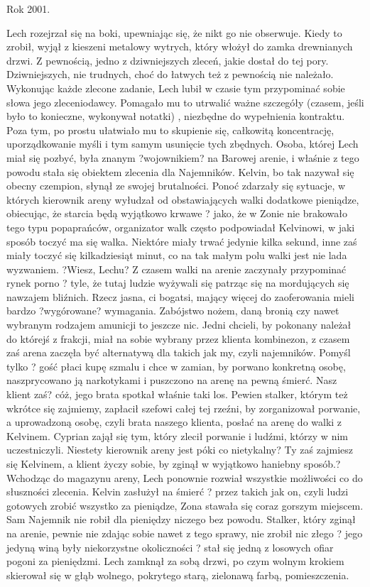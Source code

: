 \documentclass[../MAIN.tex]{subfiles}
\begin{document}
Rok 2001.


Lech rozejrzał się na boki, upewniając się, że nikt go nie obserwuje. Kiedy to zrobił, wyjął z kieszeni metalowy wytrych, który włożył do zamka drewnianych drzwi. Z pewnością, jedno z dziwniejszych zleceń, jakie dostał do tej pory. Dziwniejszych, nie trudnych, choć do łatwych też z pewnością nie należało.
Wykonując każde zlecone zadanie, Lech lubił w czasie tym przypominać sobie słowa jego zleceniodawcy. Pomagało mu to utrwalić ważne szczegóły (czasem, jeśli było to konieczne, wykonywał notatki) , niezbędne do wypełnienia kontraktu. Poza tym, po prostu ułatwiało mu to skupienie się, całkowitą koncentrację, uporządkowanie myśli i tym samym usunięcie tych zbędnych.
Osoba, której Lech miał się pozbyć, była znanym ?wojownikiem? na Barowej arenie, i właśnie z tego powodu stała się obiektem zlecenia dla Najemników. Kelvin, bo tak nazywał się obecny czempion, słynął ze swojej brutalności. Ponoć zdarzały się sytuacje, w których kierownik areny wyłudzał od obstawiających walki dodatkowe pieniądze, obiecując, że starcia będą wyjątkowo krwawe ? jako, że w Zonie nie brakowało tego typu popaprańców, organizator walk często podpowiadał Kelvinowi, w jaki sposób toczyć ma się walka. Niektóre miały trwać jedynie kilka sekund, inne zaś miały toczyć się kilkadziesiąt minut, co na tak małym polu walki jest nie lada wyzwaniem.
?Wiesz, Lechu? Z czasem walki na arenie zaczynały przypominać rynek porno ? tyle, że tutaj ludzie wyżywali się patrząc się na mordujących się nawzajem bliźnich. Rzecz jasna, ci bogatsi, mający więcej do zaoferowania mieli bardzo ?wygórowane? wymagania. Zabójstwo nożem, daną bronią czy nawet wybranym rodzajem amunicji to jeszcze nic. Jedni chcieli, by pokonany należał do którejś z frakcji, miał na sobie wybrany przez klienta kombinezon, z czasem zaś arena zaczęła być alternatywą dla takich jak my, czyli najemników.
Pomyśl tylko ? gość płaci kupę szmalu i chce w zamian, by porwano konkretną osobę, naszprycowano ją narkotykami i puszczono na arenę na pewną śmierć. Nasz klient zaś? cóż, jego brata spotkał właśnie taki los. Pewien stalker, którym też wkrótce się zajmiemy, zapłacił szefowi całej tej rzeźni, by zorganizował porwanie, a uprowadzoną osobę, czyli brata naszego klienta, posłać na arenę do walki z Kelvinem.
Cyprian zajął się tym, który zlecił porwanie i ludźmi, którzy w nim uczestniczyli. Niestety kierownik areny jest póki co nietykalny? Ty zaś zajmiesz się Kelvinem, a klient życzy sobie, by zginął w wyjątkowo haniebny sposób.?
Wchodząc do magazynu areny, Lech ponownie rozwiał wszystkie możliwości co do słuszności zlecenia. Kelvin zasłużył na śmierć ? przez takich jak on, czyli ludzi gotowych zrobić wszystko za pieniądze, Zona stawała się coraz gorszym miejscem.
Sam Najemnik nie robił dla pieniędzy niczego bez powodu. Stalker, który zginął na arenie, pewnie nie zdając sobie nawet z tego sprawy, nie zrobił nic złego ? jego jedyną winą były niekorzystne okoliczności ? stał się jedną z losowych ofiar pogoni za pieniędzmi.
Lech zamknął za sobą drzwi, po czym wolnym krokiem skierował się w głąb wolnego, pokrytego starą, zielonawą farbą, pomieszczenia.
\end{document}
